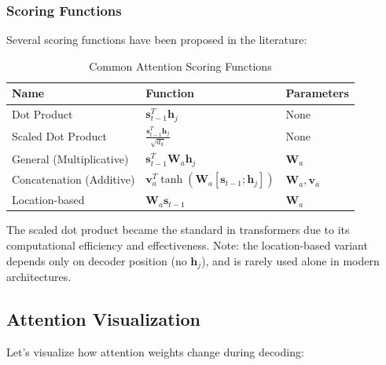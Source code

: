 \documentclass[11pt]{article}
\begin{document}
\subsubsection{Scoring Functions}

Several scoring functions have been proposed in the literature:

\begin{table}[H]
\centering
\caption{Common Attention Scoring Functions}
\begin{tabular}{l l l}
\toprule
\textbf{Name} & \textbf{Function} & \textbf{Parameters} \\
\midrule
Dot Product & $\mathbf{s}_{t-1}^T \mathbf{h}_j$ & None \\
Scaled Dot Product & $\frac{\mathbf{s}_{t-1}^T \mathbf{h}_j}{\sqrt{d_k}}$ & None \\
General (Multiplicative) & $\mathbf{s}_{t-1}^T \mathbf{W}_a \mathbf{h}_j$ & $\mathbf{W}_a$ \\
Concatenation (Additive) & $\mathbf{v}_a^T \tanh(\mathbf{W}_a[\mathbf{s}_{t-1}; \mathbf{h}_j])$ & $\mathbf{W}_a, \mathbf{v}_a$ \\
Location-based & $\mathbf{W}_a \mathbf{s}_{t-1}$ & $\mathbf{W}_a$ \\
\bottomrule
\end{tabular}
\end{table}

The scaled dot product became the standard in transformers due to its computational efficiency and effectiveness. Note: the location-based variant depends only on decoder position (no $\mathbf{h}_j$), and is rarely used alone in modern architectures.

\subsection{Attention Visualization}

Let's visualize how attention weights change during decoding:
\end{document}
